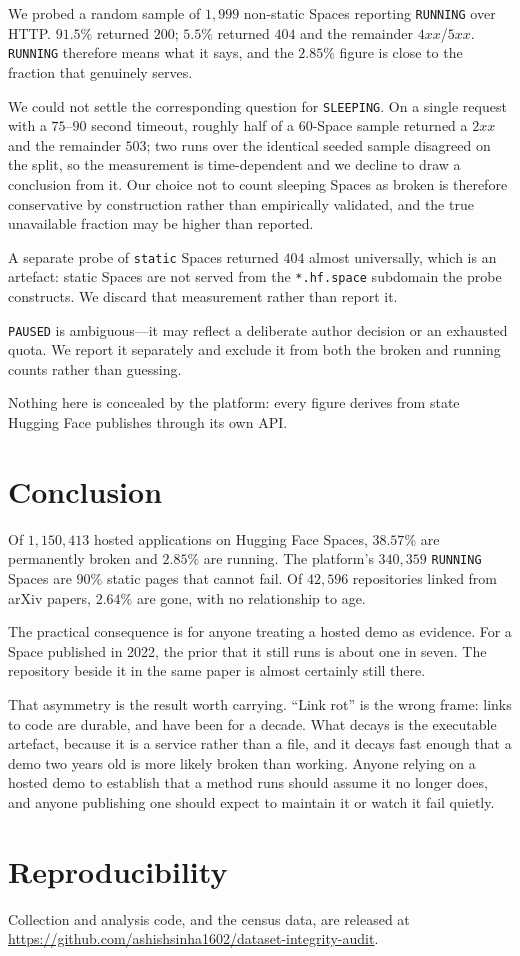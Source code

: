 \documentclass[11pt]{article}
\begin{document}
We probed a random sample of $1{,}999$ non-static Spaces reporting
\texttt{RUNNING} over HTTP. $91.5\%$ returned $200$; $5.5\%$ returned $404$ and
the remainder $4xx$/$5xx$. \texttt{RUNNING} therefore means what it says, and
the $2.85\%$ figure is close to the fraction that genuinely serves.

We could not settle the corresponding question for \texttt{SLEEPING}. On a
single request with a $75$--$90$ second timeout, roughly half of a $60$-Space
sample returned a $2xx$ and the remainder $503$; two runs over the identical
seeded sample disagreed on the split, so the measurement is time-dependent and
we decline to draw a conclusion from it. Our choice not to count sleeping
Spaces as broken is therefore conservative by construction rather than
empirically validated, and the true unavailable fraction may be higher than
reported.

A separate probe of \texttt{static} Spaces returned $404$ almost universally,
which is an artefact: static Spaces are not served from the
\texttt{*.hf.space} subdomain the probe constructs. We discard that measurement
rather than report it.

\texttt{PAUSED} is ambiguous---it may reflect a deliberate author decision or
an exhausted quota. We report it separately and exclude it from both the broken
and running counts rather than guessing.

Nothing here is concealed by the platform: every figure derives from state
Hugging Face publishes through its own API.

\section{Conclusion}

Of $1{,}150{,}413$ hosted applications on Hugging Face Spaces, $38.57\%$ are
permanently broken and $2.85\%$ are running. The platform's $340{,}359$
\texttt{RUNNING} Spaces are $90\%$ static pages that cannot fail. Of
$42{,}596$ repositories linked from arXiv papers, $2.64\%$ are gone, with no
relationship to age.

The practical consequence is for anyone treating a hosted demo as evidence.
For a Space published in 2022, the prior that it still runs is about one in
seven. The repository beside it in the same paper is almost certainly still
there.

That asymmetry is the result worth carrying. ``Link rot'' is the wrong frame:
links to code are durable, and have been for a decade. What decays is the
executable artefact, because it is a service rather than a file, and it decays
fast enough that a demo two years old is more likely broken than working.
Anyone relying on a hosted demo to establish that a method runs should assume
it no longer does, and anyone publishing one should expect to maintain it or
watch it fail quietly.

\section*{Reproducibility}

Collection and analysis code, and the census data, are released at
\url{https://github.com/ashishsinha1602/dataset-integrity-audit}.
\end{document}

